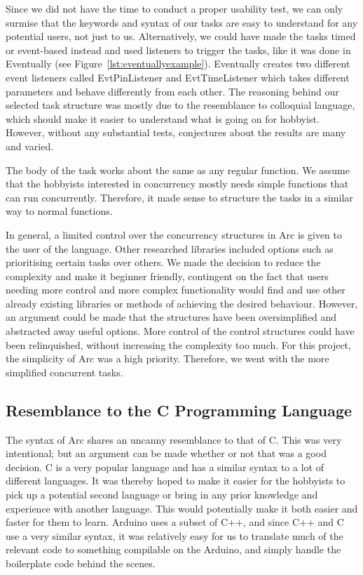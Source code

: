 Since we did not have the time to conduct a proper usability test, we can only surmise that the keywords and syntax of our tasks are easy to understand for any potential users, not just to us. Alternatively, we could have made the tasks timed or event-based instead and used listeners to trigger the tasks, like it was done in Eventually (see Figure~\ref{lst:eventuallyexample}). Eventually creates two different event listeners called EvtPinListener and EvtTimeListener which takes different parameters and behave differently from each other. The reasoning behind our selected task structure was mostly due to the resemblance to colloquial language, which should make it easier to understand what is going on for hobbyist. However, without any substantial tests, conjectures about the results are many and varied.

The body of the task works about the same as any regular function. We assume that the hobbyists interested in concurrency mostly needs simple functions that can run concurrently. Therefore, it made sense to structure the tasks in a similar way to normal functions.

In general, a limited control over the concurrency structures in Arc is given to the user of the language. Other researched libraries included options such as prioritising certain tasks over others. We made the decision to reduce the complexity and make it beginner friendly, contingent on the fact that users needing more control and more complex functionality would find and use other already existing libraries or methods of achieving the desired behaviour. However, an argument could be made that the structures have been oversimplified and abstracted away useful options. More control of the control structures could have been relinquished, without increasing the complexity too much. For this project, the simplicity of Arc was a high priority. Therefore, we went with the more simplified concurrent tasks.

\subsection{Resemblance to the C Programming Language}

The syntax of Arc shares an uncanny resemblance to that of C. This was very intentional; but an argument can be made whether or not that was a good decision. C is a very popular language and has a similar syntax to a lot of different languages. It was thereby hoped to make it easier for the hobbyists to pick up a potential second language or bring in any prior knowledge and experience with another language. This would potentially make it both easier and faster for them to learn. Arduino uses a subset of C++, and since C++ and C use a very similar syntax, it was relatively easy for us to translate much of the relevant code to something compilable on the Arduino, and simply handle the boilerplate code behind the scenes.

